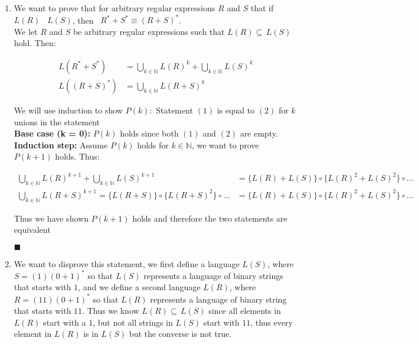 \documentclass[20pt]{article}
\begin{document}
\noindent
\begin{enumerate}[label=(\alph*),leftmargin=0cm]
    \item 
    \begin{text}
        We want to prove that for arbitrary regular expressions $R$ and $S$ that if $L(R)$ \subseteq \, $L(S)$, then \, $R^* + S^* \equiv (R + S)^*$.\\
        We let $R$ and $S$ be arbitrary regular expressions such that $L(R) \subseteq \, L(S)$ hold. Then:
    \end{text}
    \begin{align}
        L(R^*+S^*) &= \bigcup\limits_{{k} \in \mathbb{N}} L(R)^{k} + \bigcup\limits_{{k}\in \mathbb{N}} L(S)^{k}\\
        L((R+S)^{*}) &= \bigcup\limits_{{k} \in \mathbb{N}} {L(R + S)^{k}}
    \end{align}
    \begin{text}
        We will use induction to show $P(k):$ Statement $(1)$ is equal to $(2)$ for $k$ unions in the statement\\
        \textbf{Base case (k = 0):} $P(k)$ holds since both $(1)$ and $(2)$ are empty.\\
        \textbf{Induction step:} Assume $P(k)$ holds for $k\in\mathbb{N}$, we want to prove $P(k+1)$ holds. Thus:
    \end{text}
    \begin{align}
        \bigcup\limits_{{k} \in \mathbb{N}} L(R)^{k+1} + \bigcup\limits_{{k}\in \mathbb{N}} L(S)^{k+1} &= \{L(R) + L(S)\} \circ \{L(R)^2 + L(S)^2\}\circ...\nonumber\\
        \bigcup\limits_{{k} \in \mathbb{N}} {L(R + S)^{k+1}} = \{L(R + S)\} \circ \{L(R + S)^2\}\circ... &= \{L(R) + L(S)\} \circ \{L(R)^2 + L(S)^2\}\circ...\nonumber
    \end{align}
    \begin{text}
        Thus we have shown $P(k+1)$ holds and therefore the two statements are equivalent
        
        \hfill $\blacksquare$
    \end{text}
    
    \item
    \begin{text}
        We want to disprove this statement, we first define a language $L(S)$, where $S = (1)(0+1)^*$ so that $L(S)$ represents a language of binary strings that starts with $1$, and we define a second language $L(R)$, where $R = (11)(0+1)^*$ so that $L(R)$ represents a language of binary string that starts with $11$. Thus we know $L(R) \subseteq \, L(S)$ since all elements in $L(R)$ start with a $1$, but not all strings in $L(S)$ start with $11$, thus every element in $L(R)$ is in $L(S)$ but the converse is not true.\\
        

\end{text}
\end{enumerate}
\end{document}
